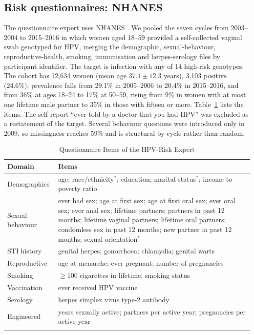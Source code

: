 \documentclass[lettersize,journal]{IEEEtran}
\begin{document}
\subsection{Risk questionnaires: NHANES}
The questionnaire expert uses NHANES \cite{nhanes}. We pooled the seven cycles from 2003--2004 to 2015--2016 in which women aged 18--59 provided a self-collected vaginal swab genotyped for HPV, merging the demographic, sexual-behaviour, reproductive-health, smoking, immunisation and herpes-serology files by participant identifier. The target is infection with any of 14 high-risk genotypes. The cohort has 12,634 women (mean age $37.1\pm12.3$ years), 3,103 positive (24.6\%); prevalence falls from 29.1\% in 2005--2006 to 20.4\% in 2015--2016, and from 36\% at ages 18--24 to 17\% at 50--59, rising from 9\% in women with at most one lifetime male partner to 35\% in those with fifteen or more. Table~\ref{tab:features} lists the items. The self-report ``ever told by a doctor that you had HPV'' was excluded as a restatement of the target. Several behaviour questions were introduced only in 2009, so missingness reaches 59\% and is structural by cycle rather than random.

\begin{table}[t]
\caption{Questionnaire Items of the HPV-Risk Expert}
\label{tab:features}
\centering\footnotesize
\setlength{\tabcolsep}{3pt}
\begin{tabular}{@{}>{\raggedright\arraybackslash}p{}>{\raggedright\arraybackslash}p{}@{}}
\toprule
Domain & Items \\
\midrule
Demographics & age; race/ethnicity$^{\ast}$; education; marital status$^{\ast}$; income-to-poverty ratio \\
Sexual behaviour & ever had sex; age at first sex; age at first oral sex; ever oral sex; ever anal sex; lifetime partners; partners in past 12 months; lifetime vaginal partners; lifetime oral partners; condomless sex in past 12 months; new partner in past 12 months; sexual orientation$^{\ast}$ \\
STI history & genital herpes; gonorrhoea; chlamydia; genital warts \\
Reproductive & age at menarche; ever pregnant; number of pregnancies \\
Smoking & $\geq$100 cigarettes in lifetime; smoking status \\
Vaccination & ever received HPV vaccine \\
Serology & herpes simplex virus type-2 antibody \\
Engineered & years sexually active; partners per active year; pregnancies per active year \\
\bottomrule
\multicolumn{2}{@{}l}{$^{\ast}$Nominal: one-hot encoded (Section~\ref{sec:tabular}).}
\end{tabular}
\end{table}
\end{document}
